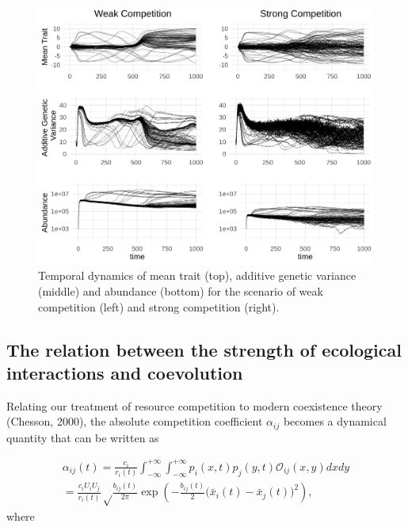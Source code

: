 \documentclass[]{elsarticle} %
\begin{document}
\begin{figure}

{\centering \includegraphics[width=1\linewidth]{community_dynamics} 

}

\caption{\label{temporal}Temporal dynamics of mean trait (top), additive genetic variance (middle) and abundance (bottom) for the scenario of weak competition (left) and strong competition (right).}\label{fig:unnamed-chunk-6}
\end{figure}

\hypertarget{the-relation-between-the-strength-of-ecological-interactions-and-coevolution}{%
\subsection{\texorpdfstring{The relation between the strength of
ecological interactions and coevolution
\label{ecoevo}}{The relation between the strength of ecological interactions and coevolution }}\label{the-relation-between-the-strength-of-ecological-interactions-and-coevolution}}

Relating our treatment of resource competition to modern coexistence
theory (Chesson, 2000), the absolute competition coefficient
\(\alpha_{ij}\) becomes a dynamical quantity that can be written as

\begin{multline}
\alpha_{ij}(t)=\frac{c_i}{r_i(t)}\int_{-\infty}^{+\infty}\int_{-\infty}^{+\infty}p_i(x,t)p_j(y,t)\mathcal O_{ij}(x,y) dxdy \\ =\frac{c_iU_iU_j}{r_i(t)}\sqrt\frac{b_{ij}(t)}{2\pi}\exp\left(-\frac{b_{ij}(t)}{2}\big(\bar x_i(t)-\bar x_j(t)\big)^2\right),
\end{multline} where
\end{document}
